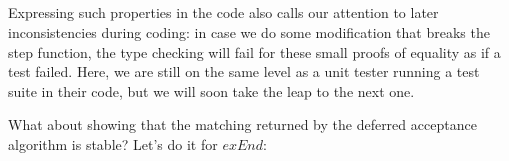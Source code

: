 {\begin{code}%
\>[0]\AgdaSpace{}%
\AgdaSymbol{:}\AgdaSpace{}%
\AgdaSpace{}%
\AgdaSpace{}%
\AgdaSpace{}%
\<%
\\
\>[0]\AgdaSpace{}%
\AgdaSymbol{=}\AgdaSpace{}%
\<%
\\
%
\\[\AgdaEmptyExtraSkip]%
\>[0]\AgdaSpace{}%
\AgdaSymbol{:}\AgdaSpace{}%
\AgdaSpace{}%
\AgdaSpace{}%
\AgdaSpace{}%
\<%
\\
\>[0]\AgdaSpace{}%
\AgdaSymbol{=}\AgdaSpace{}%
\<%
\end{code}

Expressing such properties in the code also calls our attention to later inconsistencies during coding: in case we do some modification that breaks the step function, the type checking will fail for these small proofs of equality as if a test failed. Here, we are still on the same level as a unit tester running a test suite in their code, but we will soon take the leap to the next one.

What about showing that the matching returned by the deferred acceptance algorithm is stable? Let's do it for $exEnd$:

}
